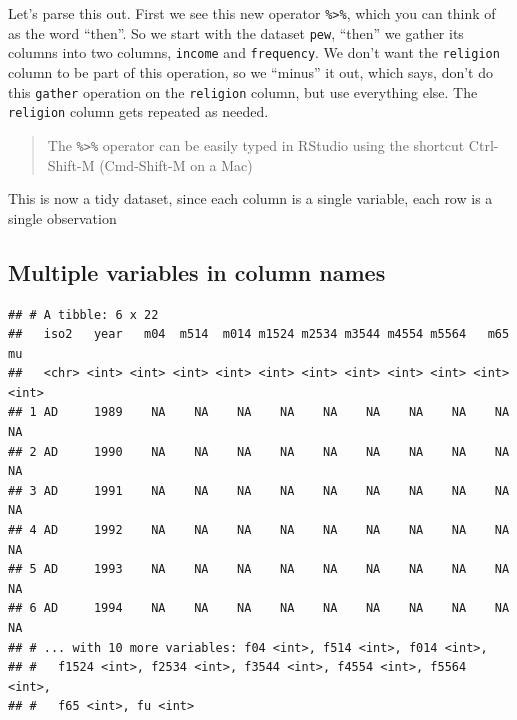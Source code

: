 \documentclass[12pt,letterpaperpaper,openany]{book}
\newenvironment{Shaded}{\begin{snugshade}}{\end{snugshade}}
\newcommand{\KeywordTok}[1]{\textcolor[rgb]{0.13,0.29,0.53}{\textbf{#1}}}
\newcommand{\NormalTok}[1]{#1}
\newcommand{\OperatorTok}[1]{\textcolor[rgb]{0.81,0.36,0.00}{\textbf{#1}}}
\newcommand{\StringTok}[1]{\textcolor[rgb]{0.31,0.60,0.02}{#1}}
\begin{document}
Let's parse this out. First we see this new operator \texttt{\%\textgreater{}\%}, which you can think of as the word ``then''.
So we start with the dataset \texttt{pew}, ``then'' we gather its columns into two columns, \texttt{income} and \texttt{frequency}.
We don't want the \texttt{religion} column to be part of this operation, so we ``minus'' it out, which says, don't do this
\texttt{gather} operation on the \texttt{religion} column, but use everything else. The \texttt{religion} column gets repeated as needed.

\begin{quote}
The \texttt{\%\textgreater{}\%} operator can be easily typed in RStudio using the shortcut Ctrl-Shift-M (Cmd-Shift-M on a Mac)
\end{quote}

This is now a tidy dataset, since each column is a single variable, each row is a single observation

\hypertarget{multiple-variables-in-column-names}{%
\subsection{Multiple variables in column names}\label{multiple-variables-in-column-names}}

\begin{Shaded}
\end{Shaded}

\begin{verbatim}
## # A tibble: 6 x 22
##   iso2   year   m04  m514  m014 m1524 m2534 m3544 m4554 m5564   m65    mu
##   <chr> <int> <int> <int> <int> <int> <int> <int> <int> <int> <int> <int>
## 1 AD     1989    NA    NA    NA    NA    NA    NA    NA    NA    NA    NA
## 2 AD     1990    NA    NA    NA    NA    NA    NA    NA    NA    NA    NA
## 3 AD     1991    NA    NA    NA    NA    NA    NA    NA    NA    NA    NA
## 4 AD     1992    NA    NA    NA    NA    NA    NA    NA    NA    NA    NA
## 5 AD     1993    NA    NA    NA    NA    NA    NA    NA    NA    NA    NA
## 6 AD     1994    NA    NA    NA    NA    NA    NA    NA    NA    NA    NA
## # ... with 10 more variables: f04 <int>, f514 <int>, f014 <int>,
## #   f1524 <int>, f2534 <int>, f3544 <int>, f4554 <int>, f5564 <int>,
## #   f65 <int>, fu <int>
\end{verbatim}
\end{document}
